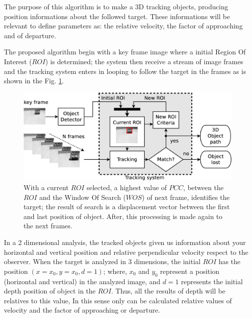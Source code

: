 The purpose of this algorithm is to make a 3D tracking objects, producing position informations 
about the followed target.
These informations will be relevant to define parameters 
as: the relative velocity, the factor of approaching and of departure.

The proposed algorithm begin with a key frame image where a initial Region Of Interest ($ROI$) is determined; 
the system then receive a stream of image frames and the tracking system 
enters in looping to follow the target in the frames as is shown in the Fig. \ref{fig:system}.


\begin{figure}[bhp]
\includegraphics[width=\columnwidth]{images/figure1-diagram1.eps}
\caption{With a current $ROI$ selected, a highest value of $PCC$, between the $ROI$ 
and the Window Of Search ($WOS$) of next frame, identifies the target; 
the result of search is a displacement vector
between the first and last position of object. 
After, this processing is made again to the next frames.}
\label{fig:system}
\end{figure}

In a 2 dimensional analysis, the tracked objects given us information about your horizontal 
and vertical position and relative perpendicular velocity respect to the observer.
When the target is analyzed in 3 dimensions, 
the initial $ROI$ has the position $(x=x_0,y=x_0,d=1)$;
where, $x_0$ and $y_0$ represent a position (horizontal and vertical) in the analyzed image,
and $d=1$ represents the initial depth position of object in the $ROI$.
Thus, all the results of depth will be relatives to this value, 
In this sense only can be calculated relative values of
velocity and the factor of approaching or departure. 

